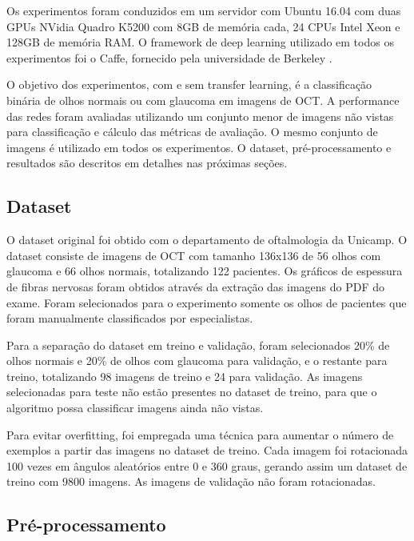 \documentclass[conference]{IEEEtran}
\begin{document}

Os experimentos foram conduzidos em um servidor com Ubuntu 16.04 com duas GPUs NVidia Quadro K5200 com 8GB de memória cada, 24 CPUs Intel Xeon e 128GB de memória RAM. O framework de deep learning utilizado em todos os experimentos foi o Caffe, fornecido pela universidade de Berkeley \cite{jia2014caffe}.

O objetivo dos experimentos, com e sem transfer learning, é a classificação binária de olhos normais ou com glaucoma em imagens de OCT. A performance das redes foram avaliadas utilizando um conjunto menor de imagens não vistas para classificação e cálculo das métricas de avaliação. O mesmo conjunto de imagens é utilizado em todos os experimentos. O dataset, pré-processamento e resultados são descritos em detalhes nas próximas seções.

  \subsection{Dataset}


  O dataset original foi obtido com o departamento de oftalmologia da Unicamp. O dataset consiste de imagens de OCT com tamanho 136x136 de 56 olhos com glaucoma e 66 olhos normais, totalizando 122 pacientes. Os gráficos de espessura de fibras nervosas foram obtidos através da extração das imagens do PDF do exame. Foram selecionados para o experimento somente os olhos de pacientes que foram manualmente classificados por especialistas.

  Para a separação do dataset em treino e validação, foram selecionados 20\% de olhos normais e 20\% de olhos com glaucoma para validação, e o restante para treino, totalizando 98 imagens de treino e 24 para validação. As imagens selecionadas para teste não estão presentes no dataset de treino, para que o algoritmo possa classificar imagens ainda não vistas.

  Para evitar overfitting, foi empregada uma técnica para aumentar o número de exemplos a partir das imagens no dataset de treino. Cada imagem foi rotacionada 100 vezes em ângulos aleatórios entre 0 e 360 graus, gerando assim um dataset de treino com 9800 imagens. As imagens de validação não foram rotacionadas.

  \subsection{Pré-processamento}
\end{document}
